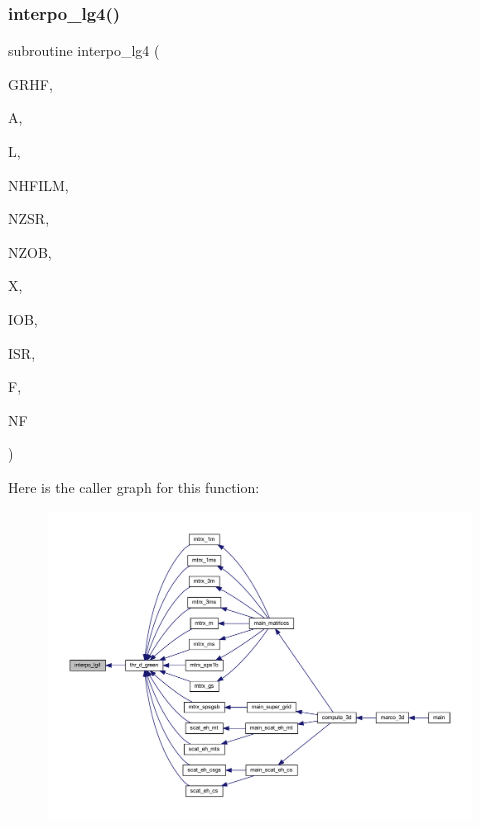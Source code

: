 \subsubsection{\texorpdfstring{interpo\+\_\+lg4()}{interpo\_lg4()}}
{\footnotesize\ttfamily subroutine interpo\+\_\+lg4 (\begin{DoxyParamCaption}\item[{complex, dimension(11,nhfilm,nzsr,nzob)}]{G\+R\+HF,  }\item[{real, dimension(l)}]{A,  }\item[{integer}]{L,  }\item[{integer}]{N\+H\+F\+I\+LM,  }\item[{integer}]{N\+Z\+SR,  }\item[{integer}]{N\+Z\+OB,  }\item[{real}]{X,  }\item[{integer}]{I\+OB,  }\item[{integer}]{I\+SR,  }\item[{complex, dimension(nf)}]{F,  }\item[{integer}]{NF }\end{DoxyParamCaption})}

Here is the caller graph for this function\+:
\nopagebreak
\begin{figure}[H]
\begin{center}
\leavevmode
\includegraphics[width=350pt]{Marco_8f90_a351cb438e704ef189fa972f9590cbd80_icgraph}
\end{center}
\end{figure}
\mbox{\label{Marco_8f90_a1715ef788d21f1b4a8008fdf5f53bfc2}} 
